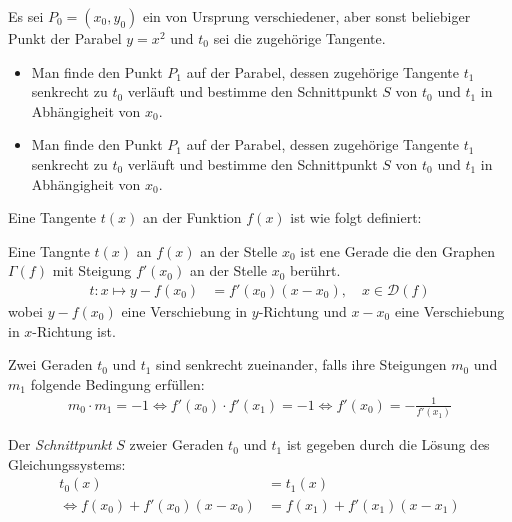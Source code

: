\documentclass[12pt]{article}
\newcommand{\sameas}{\Longleftrightarrow}
\newenvironment{definition}[2][Definition]{\begin{trivlist}
        \item[\hskip \labelsep {\bfseries #1}\hskip \labelsep {\bfseries #2.}]}{\end{trivlist}}
\newenvironment{problem}[2][Tipps \& Tricks zu]{\begin{trivlist}
        \item[\hskip \labelsep {\bfseries #1}\hskip \labelsep {\bfseries #2.}]}{\end{trivlist}}
\newenvironment{question}[2][Aufgabe]{\begin{trivlist}
        \item[\hskip \labelsep {\bfseries #1}\hskip \labelsep {\bfseries #2.}]}{\end{trivlist}}
\begin{document}
\begin{question}{3}
    Es sei $P_0 = (x_0, y_0)$ ein von Ursprung verschiedener, aber sonst beliebiger Punkt der Parabel
    $y = x^2$ und $t_0$ sei die zugehörige Tangente.
    \begin{itemize}
        \item[(a)] Man finde den Punkt $P_1$ auf der Parabel, dessen zugehörige Tangente $t_1$ senkrecht zu $t_0$
              verläuft und bestimme den Schnittpunkt $S$ von $t_0$ und $t_1$ in Abhängigheit von $x_0$.
        \item[(b)] Man finde den Punkt $P_1$ auf der Parabel, dessen zugehörige Tangente $t_1$ senkrecht zu $t_0$
              verläuft und bestimme den Schnittpunkt $S$ von $t_0$ und $t_1$ in Abhängigheit von $x_0$.
    \end{itemize}
\end{question}

\begin{problem}{3}
Eine Tangente $t(x)$ an der Funktion $f(x)$ ist wie folgt definiert:
\begin{definition}{[Tangente $t(x)$]}
    Eine Tangnte $t(x)$ an $f(x)$ an der Stelle $x_0$ ist ene Gerade die den Graphen $\Gamma(f)$ mit Steigung $f'(x_0)$ an der Stelle $x_0$  berührt.
    \begin{align*}
        t: x \longmapsto y-f(x_0) & =f'(x_0)(x-x_0), \quad x\in\mathcal{D}(f)
    \end{align*}
    wobei $y-f(x_0)$ eine Verschiebung in $y$-Richtung und $x-x_0$ eine Verschiebung in $x$-Richtung ist.
\end{definition}

\begin{definition}{[Senkrechte Geraden]}
    Zwei Geraden $t_0$ und $t_1$ sind senkrecht zueinander, falls ihre Steigungen $m_0$ und $m_1$ folgende Bedingung erfüllen:
    \begin{align*}
        m_0\cdot{m_1}=-1
        \sameas f'(x_0)\cdot{f'(x_1)}=-1
        \sameas f'(x_0)=-\frac{1}{f'(x_1)}
    \end{align*}
\end{definition}

Der \textit{Schnittpunkt} $S$ zweier Geraden $t_0$ und $t_1$ ist gegeben durch die
Lösung des Gleichungssystems:
\begin{align*}
    t_0(x)                        & = t_1(x)                \\
    \sameas f(x_0)+f'(x_0)(x-x_0) & = f(x_1)+f'(x_1)(x-x_1)
\end{align*}
\end{problem}
\end{document}
